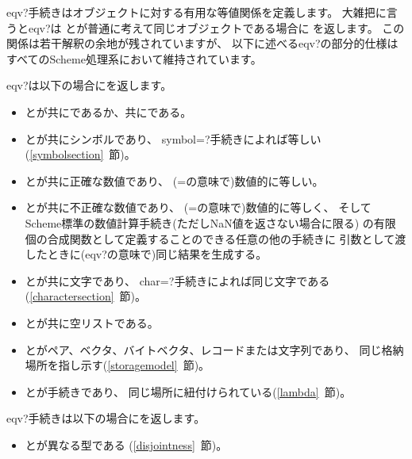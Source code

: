 \begin{entry}{%
}

{\cf eqv?}手続きはオブジェクトに対する有用な等値関係を定義します。
大雑把に言うと{\cf eqv?}は
とが普通に考えて同じオブジェクトである場合に
\schtrue{}を返します。
この関係は若干解釈の余地が残されていますが、
以下に述べる{\cf eqv?}の部分的仕様はすべてのScheme処理系において維持されています。


{\cf eqv?}は以下の場合に\schtrue{}を返します。

\begin{itemize}
\item {}とが共に\schtrue{}であるか、共に\schfalse{}である。

\item {}とが共にシンボルであり、
{\cf symbol=?}手続きによれば等しい(\ref{symbolsection}~節)。

\item {}とが共に正確な数値であり、
({\cf =}の意味で)数値的に等しい。

\item {}とが共に不正確な数値であり、
({\cf =}の意味で)数値的に等しく、
そしてScheme標準の数値計算手続き(ただしNaN値を返さない場合に限る)
の有限個の合成関数として定義することのできる任意の他の手続きに
引数として渡したときに({\cf eqv?}の意味で)同じ結果を生成する。

\item {}とが共に文字であり、
{\cf char=?}手続きによれば同じ文字である(\ref{charactersection}~節)。

\item {}とが共に空リストである。

\item {}とがペア、ベクタ、バイトベクタ、レコードまたは文字列であり、
同じ格納場所を指し示す(\ref{storagemodel}~節)。

\item {}とが手続きであり、
同じ場所に紐付けられている(\ref{lambda}~節)。
\end{itemize}

{\cf eqv?}手続きは以下の場合に\schfalse{}を返します。

\begin{itemize}
\item {}とが異なる型である
(\ref{disjointness}~節)。


\end{itemize}
\end{entry}
